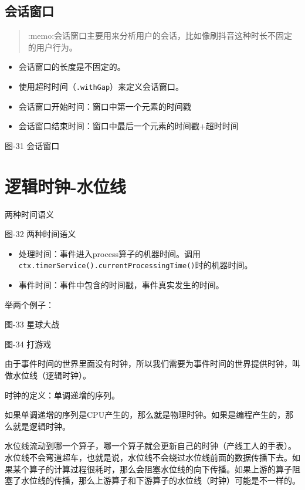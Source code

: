 \hypertarget{ux4f1aux8bddux7a97ux53e3}{%
\subsection{会话窗口}\label{ux4f1aux8bddux7a97ux53e3}}

\begin{quote}
:memo:会话窗口主要用来分析用户的会话，比如像刷抖音这种时长不固定的用户行为。
\end{quote}

\begin{itemize}
\tightlist
\item
  会话窗口的长度是{不固定}的。
\item
  使用超时时间（\texttt{.withGap}）来定义会话窗口。
\item
  会话窗口开始时间：窗口中第一个元素的时间戳
\item
  会话窗口结束时间：窗口中最后一个元素的时间戳+超时时间
\end{itemize}

图-31 会话窗口

\hypertarget{ux903bux8f91ux65f6ux949f-ux6c34ux4f4dux7ebf}{%
\section{逻辑时钟-水位线}\label{ux903bux8f91ux65f6ux949f-ux6c34ux4f4dux7ebf}}

两种时间语义

图-32 两种时间语义

\begin{itemize}
\tightlist
\item
  处理时间：事件进入process算子的机器时间。调用\texttt{ctx.timerService().currentProcessingTime()}时的机器时间。
\item
  事件时间：事件中包含的时间戳，事件真实发生的时间。
\end{itemize}

举两个例子：

图-33 星球大战

图-34 打游戏

{由于事件时间的世界里面没有时钟}，所以我们需要为事件时间的世界提供时钟，叫做{水位线（逻辑时钟）}。

时钟的定义：单调递增的序列。

如果单调递增的序列是CPU产生的，那么就是物理时钟。如果是编程产生的，那么就是逻辑时钟。

水位线流动到哪一个算子，哪一个算子就会更新自己的时钟（产线工人的手表）。水位线不会弯道超车，也就是说，水位线不会绕过水位线前面的数据传播下去。如果某个算子的计算过程很耗时，那么会阻塞水位线的向下传播。如果上游的算子阻塞了水位线的传播，那么上游算子和下游算子的水位线（时钟）可能是不一样的。

